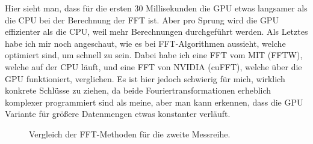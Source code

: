 \documentclass[a4paper,12pt]{article}
\theoremstyle{definition}
\theoremstyle{remark}
\begin{document}
Hier sieht man, dass für die ersten 30 Millisekunden die GPU etwas langsamer als die CPU bei der Berechnung der FFT ist. 
Aber pro Sprung wird die GPU effizienter als die CPU, weil mehr Berechnungen durchgeführt werden. Als Letztes habe ich mir 
noch angeschaut, wie es bei FFT-Algorithmen aussieht, welche optimiert sind, um schnell zu sein. Dabei habe ich eine FFT 
vom MIT (FFTW), welche auf der CPU läuft, und eine FFT von NVIDIA (cuFFT), welche über die GPU funktioniert, verglichen. Es ist hier
jedoch schwierig für mich, wirklich konkrete Schlüsse zu ziehen, da beide Fouriertransformationen erheblich komplexer programmiert sind als meine,
aber man kann erkennen, dass die GPU Variante für größere Datenmengen etwas konstanter verläuft.

\begin{figure}[H]
  \centering
  \caption{Vergleich der FFT-Methoden für die zweite Messreihe.}
\end{figure}
\end{document}
